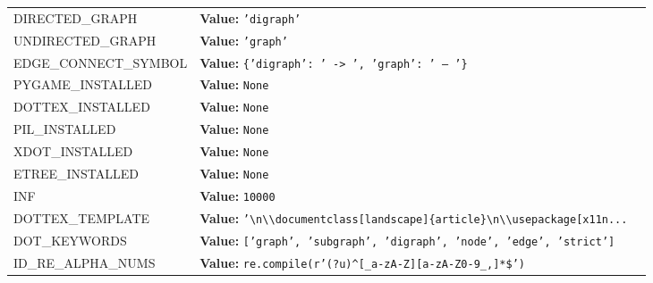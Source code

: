 \begin{longtable}{|p{\varnamewidth}|p{\vardescrwidth}|l}
\cline{1-2}
\raggedright D\-I\-R\-E\-C\-T\-E\-D\-\_\-G\-R\-A\-P\-H\- & \raggedright \textbf{Value:} 
{\tt \texttt{'}\texttt{digraph}\texttt{'}}&\\
\cline{1-2}
\raggedright U\-N\-D\-I\-R\-E\-C\-T\-E\-D\-\_\-G\-R\-A\-P\-H\- & \raggedright \textbf{Value:} 
{\tt \texttt{'}\texttt{graph}\texttt{'}}&\\
\cline{1-2}
\raggedright E\-D\-G\-E\-\_\-C\-O\-N\-N\-E\-C\-T\-\_\-S\-Y\-M\-B\-O\-L\- & \raggedright \textbf{Value:} 
{\tt \texttt{\{}\texttt{'}\texttt{digraph}\texttt{'}\texttt{: }\texttt{'}\texttt{ -{\textgreater} }\texttt{'}\texttt{, }\texttt{'}\texttt{graph}\texttt{'}\texttt{: }\texttt{'}\texttt{ -- }\texttt{'}\texttt{\}}}&\\
\cline{1-2}
\raggedright P\-Y\-G\-A\-M\-E\-\_\-I\-N\-S\-T\-A\-L\-L\-E\-D\- & \raggedright \textbf{Value:} 
{\tt None}&\\
\cline{1-2}
\raggedright D\-O\-T\-2\-T\-E\-X\-\_\-I\-N\-S\-T\-A\-L\-L\-E\-D\- & \raggedright \textbf{Value:} 
{\tt None}&\\
\cline{1-2}
\raggedright P\-I\-L\-\_\-I\-N\-S\-T\-A\-L\-L\-E\-D\- & \raggedright \textbf{Value:} 
{\tt None}&\\
\cline{1-2}
\raggedright X\-D\-O\-T\-\_\-I\-N\-S\-T\-A\-L\-L\-E\-D\- & \raggedright \textbf{Value:} 
{\tt None}&\\
\cline{1-2}
\raggedright E\-T\-R\-E\-E\-\_\-I\-N\-S\-T\-A\-L\-L\-E\-D\- & \raggedright \textbf{Value:} 
{\tt None}&\\
\cline{1-2}
\raggedright I\-N\-F\- & \raggedright \textbf{Value:} 
{\tt 10000}&\\
\cline{1-2}
\raggedright D\-O\-T\-2\-T\-E\-X\-\_\-T\-E\-M\-P\-L\-A\-T\-E\- & \raggedright \textbf{Value:} 
{\tt \texttt{'}\texttt{{\textbackslash}n{\textbackslash}{\textbackslash}documentclass[landscape]\{article\}{\textbackslash}n{\textbackslash}{\textbackslash}usepackage[x11n}\texttt{...}}&\\
\cline{1-2}
\raggedright D\-O\-T\-\_\-K\-E\-Y\-W\-O\-R\-D\-S\- & \raggedright \textbf{Value:} 
{\tt \texttt{[}\texttt{'}\texttt{graph}\texttt{'}\texttt{, }\texttt{'}\texttt{subgraph}\texttt{'}\texttt{, }\texttt{'}\texttt{digraph}\texttt{'}\texttt{, }\texttt{'}\texttt{node}\texttt{'}\texttt{, }\texttt{'}\texttt{edge}\texttt{'}\texttt{, }\texttt{'}\texttt{strict}\texttt{'}\texttt{]}}&\\
\cline{1-2}
\raggedright I\-D\-\_\-R\-E\-\_\-A\-L\-P\-H\-A\-\_\-N\-U\-M\-S\- & \raggedright \textbf{Value:} 
{\tt re.compile(r'\texttt{(?u)}{\textasciicircum}\texttt{[}\_a\texttt{-}zA\texttt{-}Z\texttt{]}\texttt{[}a\texttt{-}zA\texttt{-}Z0\texttt{-}9\_,\texttt{]}\texttt{*}\$')}&\\

\end{longtable}
